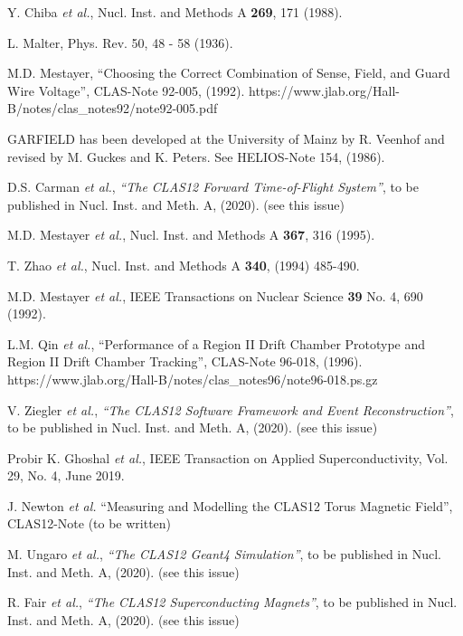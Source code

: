 \begin{thebibliography}{99}
Y. Chiba {\it et al.}, Nucl. Inst. and Methods A {\bf 269}, 171 (1988).

L. Malter, Phys. Rev. 50, 48 - 58 (1936).

M.D. Mestayer, ``Choosing the Correct Combination of Sense, Field, and Guard Wire Voltage'', CLAS-Note 
92-005, (1992). https://www.jlab.org/Hall-B/notes/clas\_notes92/note92-005.pdf

GARFIELD has been developed at the University of Mainz by R. Veenhof and
revised by M. Guckes and K. Peters.  See HELIOS-Note 154, (1986).

D.S. Carman {\it et al.}, {\it ``The CLAS12 Forward Time-of-Flight System''}, to be published in Nucl. Inst.
and Meth. A, (2020). (see this issue)

M.D. Mestayer {\it et al.}, Nucl. Inst. and Methods A {\bf 367}, 316 (1995).

T. Zhao {\it et al.}, Nucl. Inst. and Methods A {\bf 340}, (1994) 485-490.

M.D. Mestayer {\it et al.}, IEEE Transactions on Nuclear Science {\bf 39} No. 4, 690 (1992).

L.M. Qin {\it et al.}, ``Performance of a Region II Drift Chamber Prototype and Region II Drift
Chamber Tracking'', CLAS-Note 96-018, (1996).
https://www.jlab.org/Hall-B/notes/clas\_notes96/note96-018.ps.gz

V. Ziegler {\it et al.}, {\it ``The CLAS12 Software Framework and Event Reconstruction''}, to be published in Nucl. Inst.
and Meth. A, (2020). (see this issue)

Probir K. Ghoshal {\it et al.}, IEEE Transaction on Applied Superconductivity, Vol. 29, No. 4, June 2019.

J. Newton {\it et al.} ``Measuring and Modelling the CLAS12 Torus Magnetic Field'', CLAS12-Note (to be written)

M. Ungaro {\it et al.}, {\it ``The CLAS12 Geant4 Simulation''}, to be published in Nucl. Inst.
and Meth. A, (2020). (see this issue)

R. Fair {\it et al.}, {\it ``The CLAS12 Superconducting Magnets''}, to be published in Nucl. Inst.
and Meth. A, (2020). (see this issue)

\end{thebibliography}

